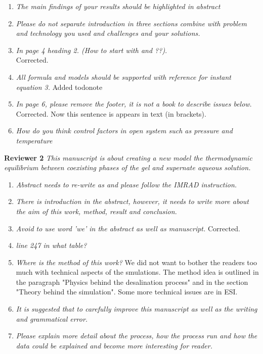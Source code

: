 \documentclass[12pt]{dinbrief}
\begin{document}
\begin{enumerate}
\item \textit{The main findings of your results should be highlighted in abstract} 

\item \textit{Please do not separate introduction in three sections combine with problem and technology you used and challenges and your solutions.}

\item \textit{In page 4 heading 2. (How to start with and ??)}.\\
Corrected.

\item \textit{All formula and models should be supported with reference for instant equation 3.}
Added todonote

\item \textit{In page 6, please remove the footer, it is not a book to describe issues below}.\\
Corrected. Now this sentence is appears in text (in brackets).


\item \textit{How do you think control factors in open system such as pressure and temperature}

\end{enumerate}


\textbf{Reviewer 2}
\textit{This manuscript is about creating a new model the thermodynamic equilibrium between coexisting phases of the gel and supernate aqueous solution.}
\begin{enumerate}

\item \textit{Abstract needs to re-write as and please follow the IMRAD instruction.}
\item \textit{There is introduction in the abstract, however, it needs to write more about the aim of this work, method, result and conclusion.}
\item \textit{Avoid to use word 'we' in the abstract as well as manuscript.}
Corrected.
\item \textit{line 247 in what table?}
\item \textit{Where is the method of this work?}
We did not want to bother the readers too much with technical aspects of the smulations. 
The method idea is outlined in the paragraph "Physics behind the desalination process" and in the section "Theory behind the simulation". Some more technical issues are in ESI.
\item \textit{It is suggested that to carefully improve this manuscript as well as the writing and grammatical error.}
\item \textit{Please explain more detail about the process, how the process run and how the data could be explained and become more interesting for reader.}

\end{enumerate}
\end{document}
